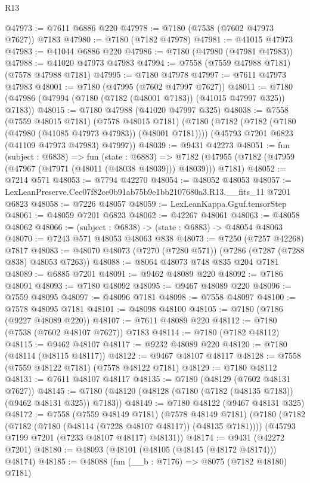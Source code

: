 \begin{lexlean}{R13}
\begin{coremodule}
@47973 := @7611 @6886 @220
@47978 := @7180 (@7538 (@7602 @47973 @7627)) @7183
@47980 := @7180 (@7182 @47978)
@47981 := @41015 @47973
@47983 := @41044 @6886 @220
@47986 := @7180 (@47980 (@47981 @47983))
@47988 := @41020 @47973 @47983
@47994 := @7558 (@7559 @47988 @7181) (@7578 @47988 @7181)
@47995 := @7180 @47978
@47997 := @7611 @47973 @47983
@48001 := @7180 (@47995 (@7602 @47997 @7627))
@48011 := @7180 (@47986 (@47994 (@7180 (@7182 (@48001 @7183)) (@41015 @47997 @325)) @7183))
@48015 := @7180 @47988 (@41020 @47997 @325)
@48038 := @7558
    (@7559 @48015 @7181)
    (@7578 @48015 @7181)
    (@7180
      (@7182 (@7182 (@7180 (@47980 (@41085 @47973 @47983)) (@48001 @7181))))
      (@45793 @7201 @6823 (@41109 @47973 @47983) @47997))
@48039 := @9431 @42273
@48051 := fun (subject : @6838) =>
  fun (state : @6883) =>
  @7182 (@47955 (@7182 (@47959 (@47967 (@47971 (@48011 (@48038 @48039))) @48039))) @7181)
@48052 := @7214 @571
@48053 := @7794 @42270
@48054 := @48052 @48053
@48057 := LexLeanPreserve.Cec07f82ce0b91ab75b9e1bb2107680a3.R13.__fits_11 @7201 @6823
@48058 := @7226 @48057
@48059 := LexLeanKappa.Gguf.tensorStep
@48061 := @48059 @7201 @6823
@48062 := @42267 @48061
@48063 := @48058 @48062
@48066 := (subject : @6838) -> (state : @6883) -> @48054 @48063
@48070 := @7243 @571 @48053 @48063 @838
@48073 := @7250 (@7257 @42268) @7817
@48083 := @48070 @48073 (@7270 (@7280 @571)) (@7286 (@7287 (@7288 @838) @48053 @7263))
@48088 := @8064 @48073 @748 @835 @204 @7181
@48089 := @6885 @7201
@48091 := @9462 @48089 @220
@48092 := @7186 @48091
@48093 := @7180 @48092
@48095 := @9467 @48089 @220
@48096 := @7559 @48095
@48097 := @48096 @7181
@48098 := @7558 @48097
@48100 := @7578 @48095 @7181
@48101 := @48098 @48100
@48105 := @7180 (@7186 (@9227 @48089 @220))
@48107 := @7611 @48089 @220
@48112 := @7180 (@7538 (@7602 @48107 @7627)) @7183
@48114 := @7180 (@7182 @48112)
@48115 := @9462 @48107
@48117 := @9232 @48089 @220
@48120 := @7180 (@48114 (@48115 @48117))
@48122 := @9467 @48107 @48117
@48128 := @7558 (@7559 @48122 @7181) (@7578 @48122 @7181)
@48129 := @7180 @48112
@48131 := @7611 @48107 @48117
@48135 := @7180 (@48129 (@7602 @48131 @7627))
@48145 := @7180 (@48120 (@48128 (@7180 (@7182 (@48135 @7183)) (@9462 @48131 @325)) @7183))
@48149 := @7180 @48122 (@9467 @48131 @325)
@48172 := @7558
    (@7559 @48149 @7181)
    (@7578 @48149 @7181)
    (@7180
      (@7182 (@7182 (@7180 (@48114 (@7228 @48107 @48117)) (@48135 @7181))))
      (@45793 @7199 @7201 (@7233 @48107 @48117) @48131))
@48174 := @9431 (@42272 @7201)
@48180 := @48093 (@48101 (@48105 (@48145 (@48172 @48174))) @48174)
@48185 := @48088 (fun (__b : @7176) => @8075 (@7182 @48180) @7181)

\end{coremodule}
\end{lexlean}
